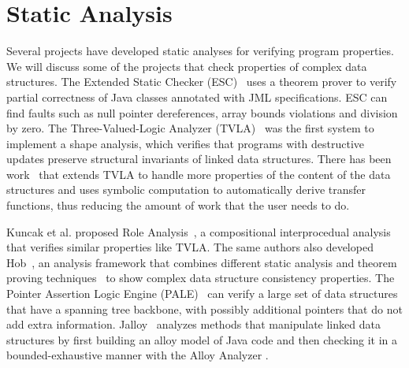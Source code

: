 \section{Static Analysis}
\label{sec:related-static-analyses}
Several projects have developed static analyses for verifying program
properties. We will discuss some of the projects that check properties
of complex data structures. The Extended Static Checker
(ESC)~\cite{flanagan2002extended} uses a theorem prover to verify
partial correctness of Java classes annotated with JML
specifications. ESC can find faults such as null pointer dereferences,
array bounds violations and division by zero. The Three-Valued-Logic
Analyzer (TVLA)~\cite{sagiv2002parametric} was the first system to
implement a shape analysis, which verifies that programs with
destructive updates preserve structural invariants of linked data
structures. There has been work~\cite{yorsh2004symbolically} that
extends TVLA to handle more properties of the content of the data
structures and uses symbolic computation to automatically derive
transfer functions, thus reducing the amount of work that the user
needs to do.

\para Kuncak et al. proposed Role Analysis~\cite{kuncak2002role}, a
compositional interprocedual analysis that verifies similar properties
like TVLA. The same authors also developed
Hob~\cite{lam2005generalized}, an analysis framework that combines
different static analysis and theorem proving
techniques~\cite{zee2004combining} to show complex data structure
consistency properties. The Pointer Assertion Logic Engine
(PALE)~\cite{moller2001pointer} can verify a large set of data
structures that have a spanning tree backbone, with possibly
additional pointers that do not add extra
information. Jalloy~\cite{jackson2000finding,vaziri2003checking}
analyzes methods that manipulate linked data structures by first
building an alloy model of Java code and then checking it in a
bounded-exhaustive manner with the Alloy Analyzer
\cite{jackson2000alcoa}.


